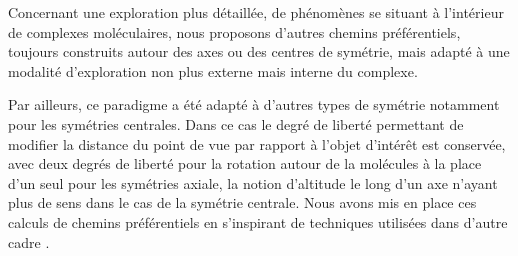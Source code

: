 Concernant une exploration plus détaillée, de phénomènes se situant à l'intérieur de complexes moléculaires, nous proposons d'autres chemins préférentiels, toujours construits autour des axes ou des centres de symétrie, mais adapté à une modalité d'exploration non plus externe mais interne du complexe.  

Par ailleurs, ce paradigme a été adapté à d'autres types de symétrie notamment pour les symétries centrales. Dans ce cas le degré de liberté permettant de modifier la distance du point de vue par rapport à l'objet d'intérêt est conservée, avec deux degrés de liberté pour la rotation autour de la molécules à la place d'un seul pour les symétries axiale, la notion d'altitude le long d'un axe n'ayant plus de sens dans le cas de la symétrie centrale. Nous avons mis en place ces calculs de chemins préférentiels en s'inspirant de techniques utilisées dans d'autre cadre \cite{khan_hovercam:_2005}.













